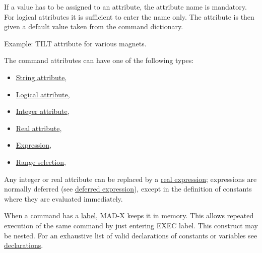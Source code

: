 If a value has to be assigned to an attribute, the
attribute name is mandatory.
For logical attributes it is sufficient to enter the name only.
The attribute is then given a default value taken from the
command dictionary.


Example: TILT attribute for various magnets.

The command attributes can have one of the following types:
\begin{itemize}
  \item \href{string.html}{String attribute},
  \item \href{logical.html}{Logical attribute},
  \item \href{integer.html}{Integer attribute},
  \item \href{real.html}{Real attribute},
  \item \href{expression.html}{Expression},
  \item \href{select.html}{Range selection},
\end{itemize}

Any integer or real attribute can be replaced by
a \href{expression.html}{real expression}; expressions are
normally deferred (see \href{expression.html#defer}{deferred
  expression}), except in the 
definition of constants where they are evaluated immediately.

When a command has a \href{label.html}{label},
MAD-X keeps it in memory.
This allows repeated execution of the same command
by just entering EXEC label. This construct may be nested.
For an exhaustive list of valid declarations of constants or variables
see \href{declarations.html}{declarations}.









